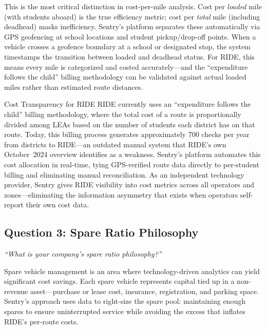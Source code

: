 \begin{description}[style=nextline, leftmargin=0.5cm]
    \item[\faIcon{divide} \textbf{Loaded vs. Deadhead Mile Distinction:}] This is the most critical distinction in cost-per-mile analysis. Cost per \textit{loaded} mile (with students aboard) is the true efficiency metric; cost per \textit{total} mile (including deadhead) masks inefficiency. Sentry's platform separates these automatically via GPS geofencing at school locations and student pickup/drop-off points. When a vehicle crosses a geofence boundary at a school or designated stop, the system timestamps the transition between loaded and deadhead status. For RIDE, this means every mile is categorized and costed accurately---and the ``expenditure follows the child'' billing methodology can be validated against actual loaded miles rather than estimated route distances.
\end{description}

\begin{sidebar}{Cost Transparency for RIDE}
RIDE currently uses an ``expenditure follows the child'' billing methodology, where the total cost of a route is proportionally divided among LEAs based on the number of students each district has on that route. Today, this billing process generates approximately 700 checks per year from districts to RIDE---an outdated manual system that RIDE's own October~2024 overview identifies as a weakness. Sentry's platform automates this cost allocation in real-time, tying GPS-verified route data directly to per-student billing and eliminating manual reconciliation. As an independent technology provider, Sentry gives RIDE visibility into cost metrics across all operators and zones---eliminating the information asymmetry that exists when operators self-report their own cost data.
\end{sidebar}

\subsection{Question 3: Spare Ratio Philosophy}
\textit{``What is your company's spare ratio philosophy?''}

\vspace{0.3cm}

Spare vehicle management is an area where technology-driven analytics can yield significant cost savings. Each spare vehicle represents capital tied up in a non-revenue asset---purchase or lease cost, insurance, registration, and parking space. Sentry's approach uses data to right-size the spare pool: maintaining enough spares to ensure uninterrupted service while avoiding the excess that inflates RIDE's per-route costs.

